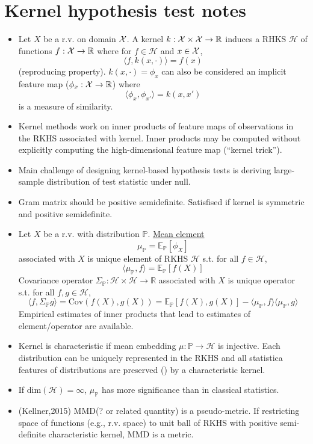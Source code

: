 \documentclass[10pt]{article}
\begin{document}
\section{Kernel hypothesis test notes}

\begin{itemize}

\item
Let $X$ be a r.v. on domain $\mathcal{X}$. A kernel $k:\mathcal{X}\times\mathcal{X}\rightarrow\mathbb{R}$ induces a RHKS $\mathcal{H}$ of functions $f:\mathcal{X}\rightarrow\mathbb{R}$ where for $f\in\mathcal{H}$ and $x\in\mathcal{X}$,
\[
\langle f,k(x,\cdot)\rangle = f(x)
\]
(reproducing property). $k(x,\cdot)=\phi_x$ can also be considered an implicit feature map ($\phi_x:\mathcal{X}\rightarrow\mathbb{R}$) where
\[
\langle \phi_x,\phi_{x'}\rangle = k(x,x')
\]
is a measure of similarity.

\item
Kernel methods work on inner products of feature maps of observations in the RKHS associated with kernel. Inner products may be computed without explicitly computing the high-dimensional feature map (``kernel trick'').

\item
Main challenge of designing kernel-based hypothesis tests is deriving large-sample distribution of test statistic under null.

\item
Gram matrix should be positive semidefinite. Satisfised if kernel is symmetric and positive semidefinite.

\item
Let $X$ be a r.v. with distribution $\mathbb{P}$. \href{https://en.wikipedia.org/wiki/Kernel_embedding_of_distributions}{Mean element}
\[
\mu_\mathbb{P} = \mathbb{E}_{\mathbb{P}}[\phi_X]
\]
associated with $X$ is unique element of RKHS $\mathcal{H}$ s.t. for all $f\in\mathcal{H}$,
\[
\langle\mu_\mathbb{P},f\rangle = \mathbb{E}_\mathbb{P}[f(X)]
\]
Covariance operator $\Sigma_\mathbb{P}:\mathcal{H}\times \mathcal{H}\rightarrow\mathbb{R}$ associated with $X$ is unique operator s.t. for all $f,g\in\mathcal{H}$,
\[
\langle f, \Sigma_\mathbb{P}g\rangle = \mathrm{Cov}(f(X),g(X)) = \mathbb{E}_\mathbb{P}[f(X),g(X)] - \langle\mu_\mathbb{P},f\rangle\langle\mu_\mathbb{P},g\rangle
\]
Empirical estimates of inner products that lead to estimates of element/operator are available.

\item
Kernel is characteristic if mean embedding $\mu:\mathbb{P}\rightarrow\mathcal{H}$ is injective. Each distribution can be uniquely represented in the RKHS and all statistica features of distributions are preserved (\todo) by a characteristic kernel.

\item
If $\mathrm{dim}(\mathcal{H})=\infty$, $\mu_\mathbb{P}$ has more significance than in classical statistics.

\item
(Kellner,2015) MMD(? or related quantity) is a pseudo-metric. If restricting space of functions (e.g., r.v. space) to unit ball of RKHS with positive semi-definite characteristic kernel, MMD is a metric.

\end{itemize}
\end{document}
